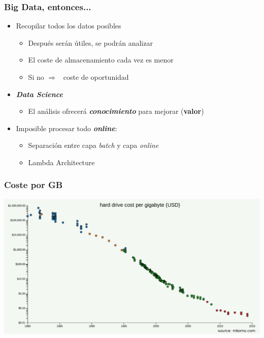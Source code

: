 \documentclass[14pt]{beamer}
\newcommand{\ra}{{\color{mdwrojo} $\Rightarrow${}~{}}}
\begin{document}
\begin{frame}
  \frametitle{Big Data, entonces...}
  \begin{itemize}
  \item Recopilar todos los datos posibles
    \begin{itemize}
    \item Después serán útiles, se podrán analizar
    \item El coste de almacenamiento cada vez es menor
    \item Si no \ra{} coste de oportunidad
    \end{itemize}
  \item {\bfseries\itshape Data Science}
    \begin{itemize}
    \item El análisis ofrecerá {\bfseries\itshape conocimiento} para
      mejorar ({\bf valor})
    \end{itemize}
  \item Imposible procesar todo {\bfseries\itshape online}:
    \begin{itemize}
    \item Separación entre capa {\em batch\/} y capa {\em online}
    \item Lambda Architecture
    \end{itemize}
  \end{itemize}
\end{frame}

\begin{frame}
  \frametitle{Coste por GB}
  \centering\includegraphics[width=\textwidth]{img/cost-per-gigabyte}
\end{frame}
\end{document}
